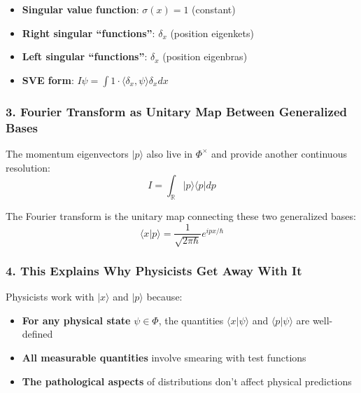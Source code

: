 \documentclass[aps,prl,reprint]{revtex4-2}
\begin{document}
\begin{itemize}
\item \textbf{Singular value function}: $\sigma(x) = 1$ (constant)

\item \textbf{Right singular ``functions''}: $\delta_x$ (position eigenkets)

\item \textbf{Left singular ``functions''}: $\delta_x$ (position eigenbras)

\item \textbf{SVE form}: $I\psi = \int 1 \cdot \langle \delta_x, \psi\rangle
\delta_x dx$
\end{itemize}

\subsubsection*{3. Fourier Transform as Unitary Map Between Generalized Bases%
}

The momentum eigenvectors $|p\rangle$ also live in $\Phi^\times$ and provide
another continuous resolution: 
\begin{equation*}
I = \int_{\mathbb{R}} |p\rangle\langle p| dp 
\end{equation*}

The Fourier transform is the unitary map connecting these two generalized
bases: 
\begin{equation*}
\langle x|p\rangle = \frac{1}{\sqrt{2\pi\hbar}} e^{ipx/\hbar} 
\end{equation*}

\subsubsection*{4. This Explains Why Physicists Get Away With It}

Physicists work with $|x\rangle$ and $|p\rangle$ because:

\begin{itemize}
\item \textbf{For any physical state} $\psi \in \Phi$, the quantities $%
\langle x|\psi\rangle$ and $\langle p|\psi\rangle$ are well-defined

\item \textbf{All measurable quantities} involve smearing with test functions

\item \textbf{The pathological aspects} of distributions don't affect
physical predictions
\end{itemize}
\end{document}

